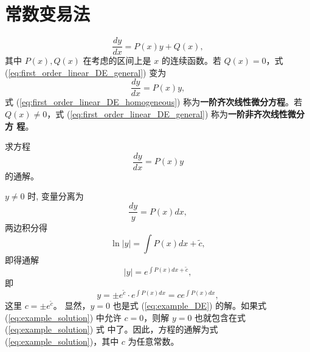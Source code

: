 \section{常数变易法}\label{sec:常数变易法}

\begin{definition}[一阶线性微分方程]
\begin{equation}
\frac{dy}{dx} = P(x)y+Q(x), \label{eq:first_order_linear_DE_general}
\end{equation}
其中 $P(x), Q(x)$ 在考虑的区间上是 $x$ 的连续函数。若 $Q(x)=0$，式 (\ref{eq:first_order_linear_DE_general}) 变为
\begin{equation}
\frac{dy}{dx} = P(x)y, \label{eq:first_order_linear_DE_homogeneous}
\end{equation}
式 (\ref{eq:first_order_linear_DE_homogeneous}) 称为\textbf{一阶齐次线性微分方程}。若 $Q(x) \ne 0$，式 (\ref{eq:first_order_linear_DE_general}) 称为\textbf{一阶非齐次线性微分方
程}。
\end{definition}

\begin{example}
    求方程
\begin{equation}
    \frac{dy}{dx} = P(x)y \label{eq:example_DE}
\end{equation}
的通解。
\end{example}
\begin{solution}
    $y \ne 0$ 时, 变量分离为
$$\frac{dy}{y} = P(x) dx,$$
两边积分得
$$\ln |y| = \int P(x) dx + \tilde{c},$$
即得通解
$$|y| = e^{\int P(x) dx + \tilde{c}},$$
即
\begin{equation}
y = \pm e^{\tilde{c}} \cdot e^{\int P(x) dx} = c e^{\int P(x) dx}, \label{eq:example_solution}
\end{equation}
这里 $c = \pm e^{\tilde{c}}$。
显然，$y=0$ 也是式 (\ref{eq:example_DE}) 的解。如果式 (\ref{eq:example_solution}) 中允许 $c=0$，则解 $y=0$ 也就包含在式 (\ref{eq:example_solution}) 式
中了。因此，方程的通解为式 (\ref{eq:example_solution})，其中 $c$ 为任意常数。
\end{solution}

